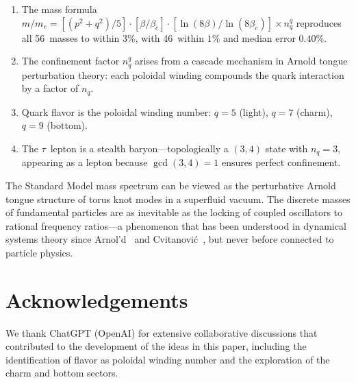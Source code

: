 \documentclass[11pt,a4paper]{article}
\begin{document}
\begin{enumerate}
  \item The mass formula $m/m_e = [(p^2+q^2)/5] \cdot [\beta/\beta_e]
    \cdot [\ln(8\beta)/\ln(8\beta_e)] \times n_q^q$ reproduces all
    56~masses to within $3\%$, with 46~within $1\%$ and median error
    $0.40\%$.

  \item The confinement factor $n_q^q$ arises from a cascade mechanism
    in Arnold tongue perturbation theory: each poloidal winding
    compounds the quark interaction by a factor of $n_q$.

  \item Quark flavor is the poloidal winding number: $q = 5$ (light),
    $q = 7$ (charm), $q = 9$ (bottom).

  \item The $\tau$~lepton is a stealth baryon---topologically a
    $(3,4)$ state with $n_q = 3$, appearing as a lepton because
    $\gcd(3,4) = 1$ ensures perfect confinement.
\end{enumerate}

The Standard Model mass spectrum can be viewed as the perturbative
Arnold tongue structure of torus knot modes in a superfluid vacuum.  The discrete
masses of fundamental particles are as inevitable as the locking of
coupled oscillators to rational frequency ratios---a phenomenon
that has been understood in dynamical systems theory since
Arnol'd~\cite{Arnold} and Cvitanovi\'c~\cite{Cvitanovic}, but
never before connected to particle physics.


\section*{Acknowledgements}

We thank ChatGPT (OpenAI) for extensive collaborative discussions
that contributed to the development of the ideas in this paper,
including the identification of flavor as poloidal winding number
and the exploration of the charm and bottom sectors.
\end{document}
